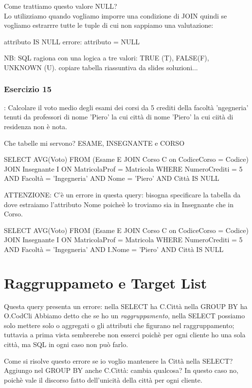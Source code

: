 \documentclass{article}
\begin{document}
Come trattiamo questo valore NULL?\\
Lo utilizziamo quando vogliamo imporre una condizione di JOIN quindi se vogliamo estrarrre tutte le tuple di cui non sappiamo una valutazione:

    attributo IS NULL errore: attributo = NULL

NB: SQL ragiona con una logica a tre valori: TRUE (T), FALSE(F), UNKNOWN (U).
copiare tabella riassuntiva da slides soluzioni...

\subsubsection{Esercizio 15}: Calcolare il voto medio degli esami dei corsi da 5 crediti della facoltà 'ngegneria' tenuti da professori di nome 'Piero' la cui città di nome 'Piero' la cui ciità di residenza non è nota.

Che tabelle mi servono? 
ESAME, INSEGNANTE e CORSO

SELECT AVG(Voto)
FROM (Esame E JOIN Corso C on CodiceCorso = Codice) JOIN Insegnante I ON MatricolaProf = Matricola
WHERE NumeroCrediti = 5 AND Facoltà = 'Ingegneria' AND Nome = 'Piero' AND Città IS NULL

ATTENZIONE: C'è un errore in questa query: bisogna specificare la tabella da dove estraiamo l'attributo Nome poicheè lo troviamo sia in Insegnante che in Corso.

SELECT AVG(Voto)
FROM (Esame E JOIN Corso C on CodiceCorso = Codice) JOIN Insegnante I ON MatricolaProf = Matricola
WHERE NumeroCrediti = 5 AND Facoltà = 'Ingegneria' AND I.Nome = 'Piero' AND Città IS NULL



\section{Raggruppameto e Target List}
Questa query presenta un errore:
nella SELECT ha C.Città
nella GROUP BY ha O.CodCli
Abbiamo detto che se ho un \emph{raggruppamento}, nella SELECT possiamo solo mettere solo o aggregati o gli attributi che figurano nel raggruppamento; tuttavia a prima vista sembrerebe non esserci poichè per ogni cliente ho una sola città, ma SQL in ogni caso non può farlo.

Come si risolve questo errore se io voglio mantenere la Città nella SELECT?
Aggiungo nel GROUP BY anche C.Città: cambia qualcosa? In questo caso no, poichè vale il discorso fatto dell'unicità della città per ogni cliente.
\end{document}
